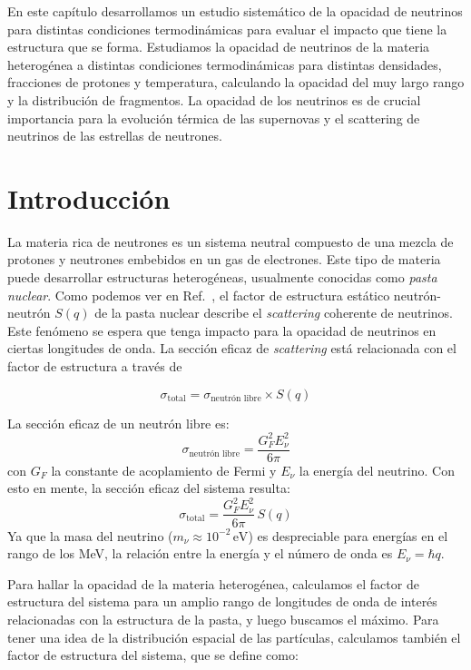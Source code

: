 En este capítulo desarrollamos un estudio sistemático de la opacidad de neutrinos para distintas condiciones termodinámicas para evaluar el impacto que tiene la estructura que se forma.
Estudiamos la opacidad de neutrinos de la materia heterogénea a distintas condiciones termodinámicas para distintas densidades, fracciones de protones y temperatura, calculando la opacidad del muy largo rango y la distribución de fragmentos.
La opacidad de los neutrinos es de crucial importancia para la evolución térmica de las supernovas y el scattering de neutrinos de las estrellas de neutrones.

\section{Introducción}
La materia rica de neutrones es un sistema neutral compuesto de una mezcla de protones y neutrones embebidos en un gas de electrones.
Este tipo de materia puede desarrollar estructuras heterogéneas, usualmente conocidas como \emph{pasta nuclear}.
Como podemos ver en Ref.~\cite{horowitz_nonuniform_2004, horowitz_neutrino-pasta_2004}, el factor de estructura estático neutrón-neutrón $S(q)$ de la pasta nuclear describe el \emph{scattering} coherente de neutrinos.
Este fenómeno se espera que tenga impacto para la opacidad de neutrinos en ciertas longitudes de onda.
La sección eficaz de \emph{scattering} está relacionada con el factor de estructura a través de

\begin{equation}
 \sigma_{\text{total}} = \sigma_{\text{neutrón libre}} \times S(q)
\end{equation}

La sección eficaz de un neutrón libre es:
\begin{equation}
\sigma_{\text{neutrón libre}} = \frac{G_F^2E_\nu^2}{6\pi}
\end{equation}
con $G_F$ la constante de acoplamiento de Fermi y $E_\nu$ la energía del neutrino.
Con esto en mente, la sección eficaz del sistema resulta:
\begin{equation}
\sigma_{\text{total}} = \frac{G_F^2E_\nu^2}{6\pi}\, S(q)
\label{eq:opac}
\end{equation}
Ya que la masa del neutrino ($m_\nu \approx 10^{-2}\,\text{eV}$) es despreciable para energías en el rango de los MeV, la relación entre la energía y el número de onda es $E_\nu = \hbar q$.

Para hallar la opacidad de la materia heterogénea, calculamos el factor de estructura del sistema para un amplio rango de longitudes de onda de interés relacionadas con la estructura de la pasta, y luego buscamos el máximo.
Para tener una idea de la distribución espacial de las partículas, calculamos también el factor de estructura del sistema, que se define como:

